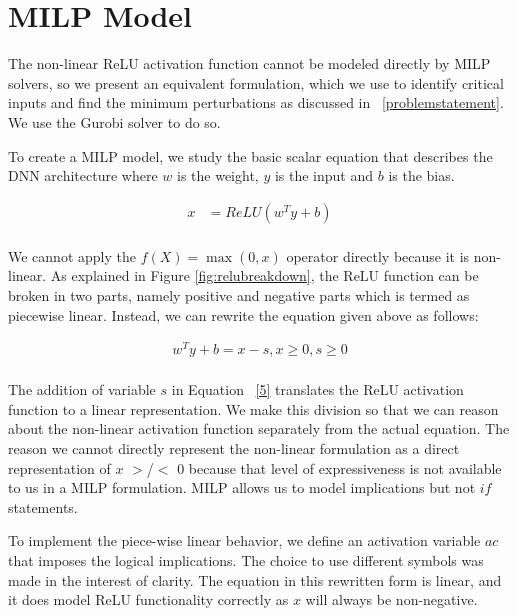 \section{MILP Model}
The non-linear ReLU activation function cannot be modeled directly by MILP solvers, so we present an equivalent formulation, which we use to identify critical inputs and find the minimum perturbations as discussed in ~\ref{problemstatement}. 
We use the Gurobi solver to do so. 

 To create a \ac{MILP} model, we study the basic scalar equation that describes the \ac{DNN} architecture where $w$ is the weight, $y$ is the input and $b$ is the bias. 

\begin{equation}
\label{4}
\begin{aligned}
x &= ReLU(w^Ty + b) \\
\end{aligned}
\end{equation}
 

We cannot apply the $f(X) = \max(0, x)$ operator directly because it is non-linear. 
As explained in Figure \ref{fig:relubreakdown}, the ReLU function can be broken in two parts, namely positive and negative parts which is termed as piecewise linear. 
Instead, we can rewrite the equation given above as follows:

\begin{equation}
\label{5}
\begin{aligned}
w^Ty + b = x - s, x \geq 0, s \geq 0 \\
\end{aligned}
\end{equation}

The addition of variable $s$ in Equation ~\ref{5} translates the ReLU activation function to a linear representation.
We make this division so that we can reason about the non-linear activation function separately from the actual equation. 
The reason we cannot directly represent the non-linear formulation as a direct representation of $x$ $>$/$<$ $0$ because that level of expressiveness is not available to us in a \ac{MILP}  formulation. 
\ac{MILP} allows us to model implications but not $if$ statements.



 To implement the piece-wise linear behavior, we define an activation variable $ac$ that imposes the logical implications. 
The choice to use different symbols was made in the interest of clarity. 
The equation in this rewritten form is linear, and it does model ReLU functionality  correctly as $x$ will always be non-negative. 

